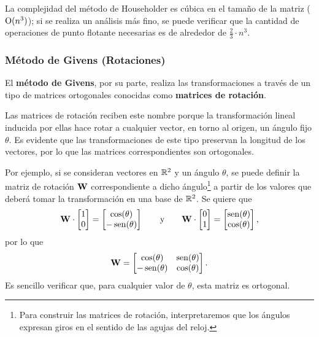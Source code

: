 La complejidad del método de Householder es cúbica en el tamaño de la
matriz ($\mathrm{O}(n^3)$); si se realiza un análisis más fino, se puede verificar
que la cantidad de operaciones de punto flotante necesarias es de alrededor
de $\frac{2}{3} \cdot n^3$.

\subsubsection{Método de Givens (Rotaciones)}
El \textbf{método de Givens}, por su parte, realiza las transformaciones
a través de un tipo de matrices ortogonales conocidas como
\textbf{matrices de rotación}.

Las matrices de rotación reciben este nombre porque la transformación
lineal inducida por ellas hace rotar a cualquier vector, en torno al origen,
un ángulo fijo $\theta$. Es evidente que las transformaciones de este tipo
preservan la longitud de los vectores, por lo que las matrices
correspondientes son ortogonales.

Por ejemplo, si se consideran vectores en $\mathbb{R}^2$ y un ángulo $\theta$,
se puede definir la matriz de rotación $\mathbf{W}$ correspondiente a dicho
ángulo\footnote{Para construir las matrices de rotación, interpretaremos
que los ángulos expresan giros en el sentido de las agujas del reloj.}
a partir de los valores que deberá tomar la transformación en una base de
$\mathbb{R}^2$.
Se quiere que
\[
\mathbf{W} \cdot \begin{bmatrix} 1 \\ 0 \end{bmatrix} =
    \begin{bmatrix}\cos(\theta) \\ -\operatorname{sen}(\theta) \end{bmatrix}
\qquad \text{y} \qquad
\mathbf{W} \cdot \begin{bmatrix} 0 \\ 1 \end{bmatrix} =
    \begin{bmatrix}\operatorname{sen}(\theta) \\ \cos(\theta) \end{bmatrix},
\]
por lo que
\[
\mathbf{W} = \begin{bmatrix}
    \cos(\theta)   & \operatorname{sen}(\theta) \\
    - \operatorname{sen}(\theta) & \cos(\theta)
\end{bmatrix}.
\]
Es sencillo verificar que, para cualquier valor de $\theta$, esta matriz es
ortogonal.

